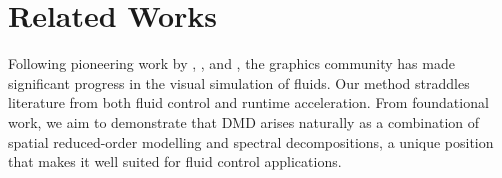 \section{Related Works}
\label{sec:related_works}

Following pioneering work by \citet{foster1996liquids}, \citet{stam2023stable}, and \citet{fedkiw2001visual}, the graphics community has made significant progress in the visual simulation of fluids.
Our method straddles literature from both fluid control and runtime acceleration. From foundational work, we aim to demonstrate that DMD arises naturally as a combination of spatial reduced-order modelling and spectral decompositions, a unique position that makes it well suited for fluid control applications.



